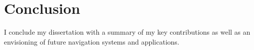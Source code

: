 \chapter{Conclusion}
\label{conclusion}

I conclude my dissertation with a summary of my key contributions as well as an envisioning of future navigation systems and applications.